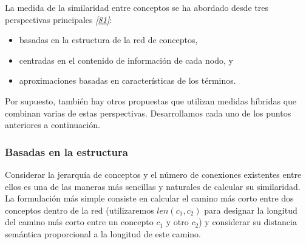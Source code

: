 \documentclass[a4paper,12pt,spanish]{book}
\begin{document}
La medida de la similaridad entre conceptos se ha abordado desde tres perspectivas principales
\label{1.state-of-the-art/ii.medidas-distancia:id29}{\hyperref[zreferences:slimani2013]{\emph{{[}81{]}}}}:
\begin{itemize}
\item {} 
basadas en la estructura de la red de conceptos,

\item {} 
centradas en el contenido de información de cada nodo, y

\item {} 
aproximaciones basadas en características de los términos.

\end{itemize}

Por supuesto, también hay otros propuestas que utilizan medidas híbridas que combinan
varias de estas perspectivas. Desarrollamos cada uno de los puntos anteriores a continuación.


\subsubsection{Basadas en la estructura}
\label{1.state-of-the-art/ii.medidas-distancia:redes-conceptos-estructura}\label{1.state-of-the-art/ii.medidas-distancia:basadas-en-la-estructura}
Considerar la jerarquía de conceptos y el número de conexiones existentes entre ellos es una
de las maneras más sencillas y naturales de calcular su similaridad. La formulación más
simple consiste en calcular el camino más corto entre dos conceptos dentro de la red
(utilizaremos \(len(c_1, c_2)\) para designar la longitud del camino más corto entre
un concepto \(c_1\) y otro \(c_2\)) y
considerar su distancia semántica proporcional a la longitud de este camino.
\end{document}
